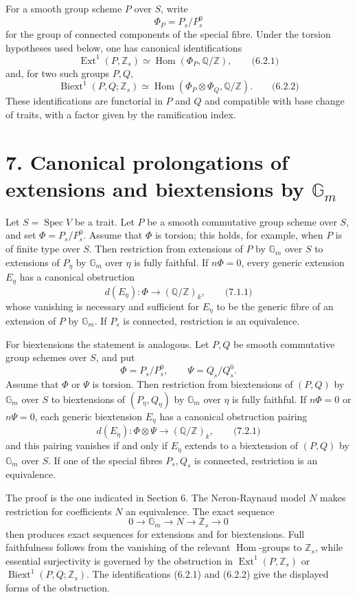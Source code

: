 \documentclass[11pt]{article}
\providecommand{\Spec}{\operatorname{Spec}}
\providecommand{\Z}{\mathbb Z}
\providecommand{\Q}{\mathbb Q}
\providecommand{\Gm}{\mathbb G_m}
\providecommand{\Hom}{\operatorname{Hom}}
\providecommand{\Ext}{\operatorname{Ext}}
\providecommand{\Biext}{\operatorname{Biext}}
\providecommand{\Ext}{\operatorname{Ext}}
\providecommand{\Hom}{\operatorname{Hom}}
\providecommand{\Spec}{\operatorname{Spec}}
\providecommand{\Gm}{\mathbb G_m}
\providecommand{\Z}{\mathbb Z}
\providecommand{\Q}{\mathbb Q}
\begin{document}
For a smooth group scheme \(P\) over \(S\), write
\[
        \Phi_P=P_s/P_s^0
\]
for the group of connected components of the special fibre.  Under the torsion hypotheses used below, one has canonical identifications
\[
        \Ext^1(P,\Z_s)\simeq \Hom(\Phi_P,\Q/\Z),
\qquad\text{(6.2.1)}
\]
and, for two such groups \(P,Q\),
\[
        \Biext^1(P,Q;\Z_s)\simeq \Hom(\Phi_P\otimes \Phi_Q,\Q/\Z).
\qquad\text{(6.2.2)}
\]
These identifications are functorial in \(P\) and \(Q\) and compatible with base change of traits, with a factor given by the ramification index.

\section*{7. Canonical prolongations of extensions and biextensions by \(\Gm\)}

Let \(S=\Spec V\) be a trait.  Let \(P\) be a smooth commutative group scheme over \(S\), and set \(\Phi=P_s/P_s^0\).  Assume that \(\Phi\) is torsion; this holds, for example, when \(P\) is of finite type over \(S\).  Then restriction from extensions of \(P\) by \(\Gm\) over \(S\) to extensions of \(P_\eta\) by \(\Gm\) over \(\eta\) is fully faithful.  If \(n\Phi=0\), every generic extension \(E_\eta\) has a canonical obstruction
\[
        d(E_\eta):\Phi\longrightarrow (\Q/\Z)_k,
\qquad\text{(7.1.1)}
\]
whose vanishing is necessary and sufficient for \(E_\eta\) to be the generic fibre of an extension of \(P\) by \(\Gm\).  If \(P_s\) is connected, restriction is an equivalence.

For biextensions the statement is analogous.  Let \(P,Q\) be smooth commutative group schemes over \(S\), and put
\[
        \Phi=P_s/P_s^0,
        \qquad
        \Psi=Q_s/Q_s^0.
\]
Assume that \(\Phi\) or \(\Psi\) is torsion.  Then restriction from biextensions of \((P,Q)\) by \(\Gm\) over \(S\) to biextensions of \((P_\eta,Q_\eta)\) by \(\Gm\) over \(\eta\) is fully faithful.  If \(n\Phi=0\) or \(n\Psi=0\), each generic biextension \(E_\eta\) has a canonical obstruction pairing
\[
        d(E_\eta):\Phi\otimes \Psi\longrightarrow (\Q/\Z)_k,
\qquad\text{(7.2.1)}
\]
and this pairing vanishes if and only if \(E_\eta\) extends to a biextension of \((P,Q)\) by \(\Gm\) over \(S\).  If one of the special fibres \(P_s,Q_s\) is connected, restriction is an equivalence.

The proof is the one indicated in Section 6.  The Neron-Raynaud model \(N\) makes restriction for coefficients \(N\) an equivalence.  The exact sequence
\[
        0\to\Gm\to N\to \Z_s\to 0
\]
then produces exact sequences for extensions and for biextensions.  Full faithfulness follows from the vanishing of the relevant \(\Hom\)-groups to \(\Z_s\), while essential surjectivity is governed by the obstruction in \(\Ext^1(P,\Z_s)\) or \(\Biext^1(P,Q;\Z_s)\).  The identifications (6.2.1) and (6.2.2) give the displayed forms of the obstruction.
\end{document}
